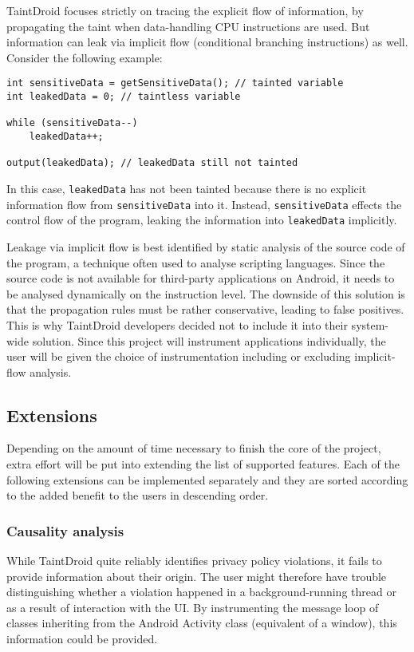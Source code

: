 \documentclass[12pt]{article}
\begin{document}
TaintDroid focuses strictly on tracing the explicit flow of information, 
by propagating the taint when data-handling CPU instructions are used. 
But information can leak via implicit flow (conditional branching 
instructions) as well. Consider the following example:

\begin{verbatim}
int sensitiveData = getSensitiveData(); // tainted variable
int leakedData = 0; // taintless variable

while (sensitiveData--)
    leakedData++;

output(leakedData); // leakedData still not tainted
\end{verbatim}

In this case, \verb|leakedData| has not been tainted because there is 
no explicit information flow from \verb|sensitiveData| into it. Instead, 
\verb|sensitiveData| effects the control flow of the program, leaking
the information into \verb|leakedData| implicitly. 

Leakage via implicit flow is best identified by static analysis of the 
source code of the program, a technique often used to analyse scripting
languages. Since the source code is not available for third-party 
applications on Android, it needs to be analysed dynamically on the 
instruction level. The downside of this solution is that the propagation 
rules must be rather conservative, leading to false positives. This is 
why TaintDroid developers decided not to include it into their
system-wide solution. Since this project will instrument applications
individually, the user will be given the choice of instrumentation 
including or excluding implicit-flow analysis.

\subsection*{Extensions}

Depending on the amount of time necessary to finish the core of the project,
extra effort will be put into extending the list of supported features. Each 
of the following extensions can be implemented separately and they are 
sorted according to the added benefit to the users in descending order.

\subsubsection*{Causality analysis}

While TaintDroid quite reliably identifies privacy policy violations,
it fails to provide information about their origin. The user might therefore 
have trouble distinguishing whether a violation happened in a 
background-running thread or as a result of interaction with the UI. 
By instrumenting the message loop of classes inheriting from the Android 
Activity class (equivalent of a window), this information could be provided.
\end{document}
